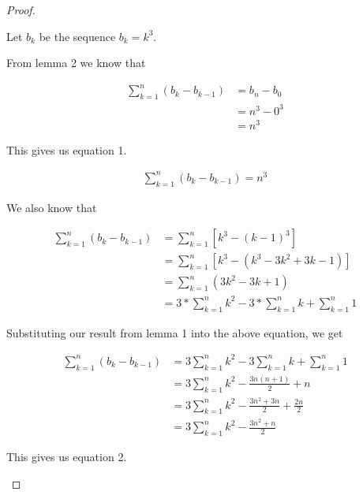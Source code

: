\documentclass{article}
\begin{document}
\begin{proof}
\begin{flushleft}
Let $b_{k}$ be the sequence $b_{k} = k^3$.
\end{flushleft}

\begin{flushleft}
From lemma 2 we know that
\end{flushleft}

\begin{align*}
\sum_{k=1}^{n} (b_{k} - b_{k-1}) &= b_{n} - b_{0} \\
&= n^3 - 0^3 \\
&= n^3
\end{align*}

\begin{flushleft}
This gives us equation 1.
\end{flushleft}

\begin{align}
\sum_{k=1}^{n} (b_{k} - b_{k-1}) = n^3
\end{align}

\begin{flushleft}
We also know that 
\end{flushleft}

\begin{align*}
\sum_{k=1}^{n} (b_{k} - b_{k-1}) &= \sum_{k=1}^{n} [k^3 - (k-1)^3] \\
&= \sum_{k=1}^{n} [k^3 - (k^3 - 3k^2 + 3k - 1)] \\
&= \sum_{k=1}^{n} (3k^2 - 3k + 1) \\
&= 3 * \sum_{k=1}^{n} k^2 - 3 * \sum_{k=1}^{n} k + \sum_{k=1}^{n} 1
\end{align*}

\begin{flushleft}
Substituting our result from lemma 1 into the above equation, we get
\end{flushleft}

\begin{align*}
\sum_{k=1}^{n} (b_{k} - b_{k-1}) &= 3 \sum_{k=1}^{n} k^2 - 3 \sum_{k=1}^{n} k + \sum_{k=1}^{n} 1 \\
&= 3 \sum_{k=1}^{n} k^2 - \frac{3n(n+1)}{2} + n \\
&= 3 \sum_{k=1}^{n} k^2 - \frac{3n^2+3n}{2} + \frac{2n}{2} \\
&=  3 \sum_{k=1}^{n} k^2 - \frac{3n^2+n}{2}
\end{align*}

\begin{flushleft}
This gives us equation 2.
\end{flushleft}


\end{proof}
\end{document}
